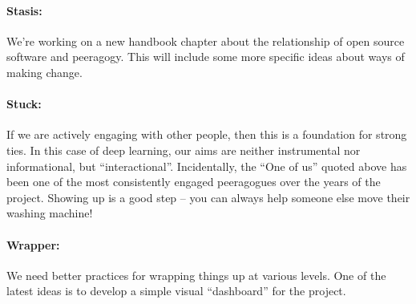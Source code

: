 \paragraph{Stasis:} We’re working on a new handbook chapter about the relationship of open
source software and peeragogy. This will include some more specific
ideas about ways of making change.

\paragraph{Stuck:} If we are actively engaging with other people, then this is a foundation
for strong ties. In this case of deep learning, our aims are neither
instrumental nor informational, but “interactional”. Incidentally, the
“One of us” quoted above has been one of the most consistently engaged
peeragogues over the years of the project. Showing up is a good step –
you can always help someone else move their washing machine!

\paragraph{Wrapper:}  We need better practices for wrapping things up at
various levels.  One of the latest ideas is to develop a simple visual
``dashboard'' for the project.
